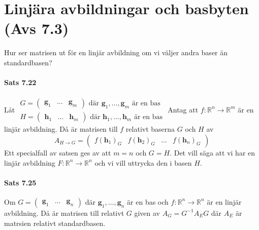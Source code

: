 \section{Linjära avbildningar och basbyten (Avs 7.3)}
Hur ser matrisen ut för en linjär avbildning om vi väljer andra baser än standardbasen?

\paragraph{Sats 7.22} Låt $\begin{matrix}
    G=\begin{pmatrix}\bm{g}_1&\ldots&\bm{g}_m\end{pmatrix}\text{ där }\bm{g}_1,\ldots,\bm{g}_m \text{ är en bas}\\
    H=\begin{pmatrix}\bm{h}_1&\ldots&\bm{h}_m\end{pmatrix}\text{ där }\bm{h}_1,\ldots,\bm{h}_m \text{ är en bas}
\end{matrix}$
Antag att $f:\mathbb{R}^n\rightarrow\mathbb{R}^m$ är en linjär avbildning.
Då är matrisen till $f$ relativt baserna $G$ och $H$ av
\begin{equation*}
    A_{H\rightarrow G}=
    \begin{pmatrix}
        f(\bm{h}_1)_G&f(\bm{h}_2)_G&\ldots&f(\bm{h}_n)_G
    \end{pmatrix}
\end{equation*}
Ett specialfall av satsen ges av att $m=n$ och $G=H$.
Det vill säga att vi har en linjär avbildning $F:\mathbb{R}^n\rightarrow\mathbb{R}^n$ och vi vill uttrycka den i basen $H$.

\paragraph{Sats 7.25} Om $G=\begin{pmatrix}\bm{g}_1&\ldots&\bm{g}_n\end{pmatrix}$ där $\bm{g}_1,\ldots,\bm{g}_n$ är en bas
och $f:\mathbb{R}^n\rightarrow\mathbb{R}^n$ är en linjär avbildning.
Då är matrisen till relativt $G$ given av $A_G=G^{-1}A_EG$ där $A_E$ är matrsien relativt standardbasen.

\clearpage
